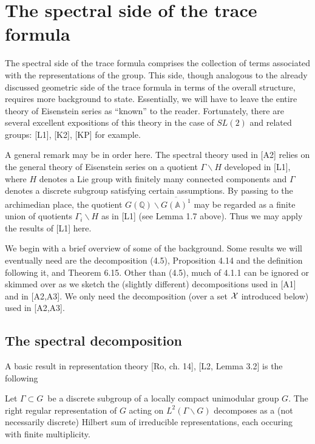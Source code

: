 \section{The spectral side of the trace formula}

The spectral side of the trace formula comprises the collection of terms
associated with the representations of the group. This side, though
analogous to the already discussed geometric side of the trace formula in
terms of the overall structure, requires more background to state.
Essentially, we will have to leave the entire theory of Eisenstein series as
``known'' to the reader. Fortunately, there are several excellent
expositions of this theory in the case of $SL(2)$ and related groups:
[L1], [K2], [KP] for example.

A general remark may be in order here. The spectral theory used in [A2]
relies on the general theory of Eisenstein series on a quotient $\Gamma
\backslash H$ developed in [L1], where $H$ denotes a Lie group with finitely
many connected components and $\Gamma $ denotes a discrete subgroup
satisfying certain assumptions. By passing to the archimedian place, the
quotient $G({\mathbb{Q}})\backslash \overline{G({\mathbb{A}})^1}$ may be regarded as a
finite union of quotients $\Gamma _i\backslash H$ as in [L1]
(see Lemma 1.7 above). Thus we may apply the results of [L1] here.

We begin with a brief overview of some of the background. Some results we
will eventually need are the decomposition (4.5), Proposition 4.14
and the definition following it, and Theorem 6.15. Other than (4.5),
much of 4.1.1 can be ignored or skimmed over as we sketch the
(slightly different) decompositions used in [A1] and in [A2,A3].
We only need the decomposition (over a set ${\cal{X}}$ introduced below)
used in [A2,A3].

\subsection{The spectral decomposition}

A basic result in representation theory [Ro, ch. 14], [L2, Lemma 3.2] is the
following

\begin{lemma}
Let $\Gamma \subset G$\ be a discrete subgroup of a locally compact
unimodular group $G$. The right regular representation of $G$
acting on $L^2(\Gamma \backslash G)$
decomposes as a (not necessarily discrete)
Hilbert sum of irreducible representations, each occuring with finite
multiplicity.
\end{lemma}

